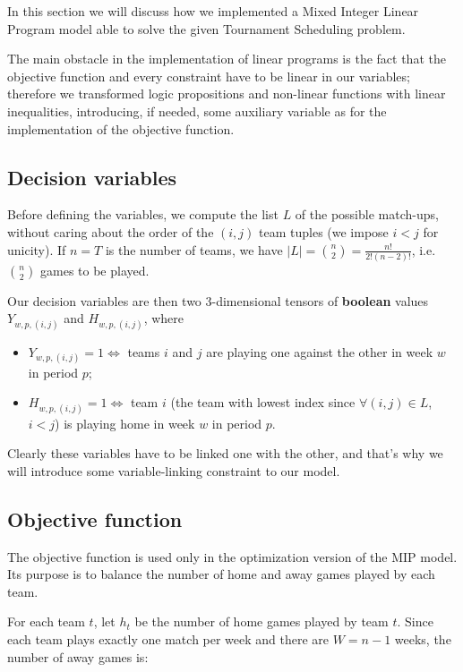 In this section we will discuss how we implemented a Mixed Integer Linear Program model able to solve the given Tournament Scheduling problem.

The main obstacle in the implementation of linear programs is the fact that the objective function and every constraint have to be linear in our variables; therefore we transformed logic propositions and non-linear functions with linear inequalities, introducing, if needed, some auxiliary variable as for the implementation of the objective function.

\subsection{Decision variables}
Before defining the variables, we compute the list $L$ of the possible match-ups, without caring about the order of the $(i,j)$ team tuples (we impose $i<j$ for unicity).
If $n=T$ is the number of teams, we have $|L|=\binom{n}{2} = \frac{n!}{2!(n-2)!}$, i.e. $\binom{n}{2}$ games to be played.


Our decision variables are then two 3-dimensional tensors of \textbf{boolean} values $Y_{w,p,(i,j)}$ and $H_{w,p,(i,j)}$, where
\begin{itemize}
    \item $Y_{w,p,(i,j)} = 1 \iff$ teams $i$ and $j$ are playing one against the other in week $w$ in period $p$;
    \item $H_{w,p,(i,j)} = 1 \iff$ team $i$ (the team with lowest index since $\forall (i,j) \in L$, $i<j$) is playing home in week $w$ in period $p$.
\end{itemize}

Clearly these variables have to be linked one with the other, and that's why we will introduce some variable-linking constraint to our model.


\subsection{Objective function}\label{obj_function exple}

The objective function is used only in the optimization version of the MIP
model. Its purpose is to balance the number of home and away games played by
each team.

For each team $t$, let $h_t$ be the number of home games played by team $t$.
Since each team plays exactly one match per week and there are $W = n - 1$
weeks, the number of away games is:

